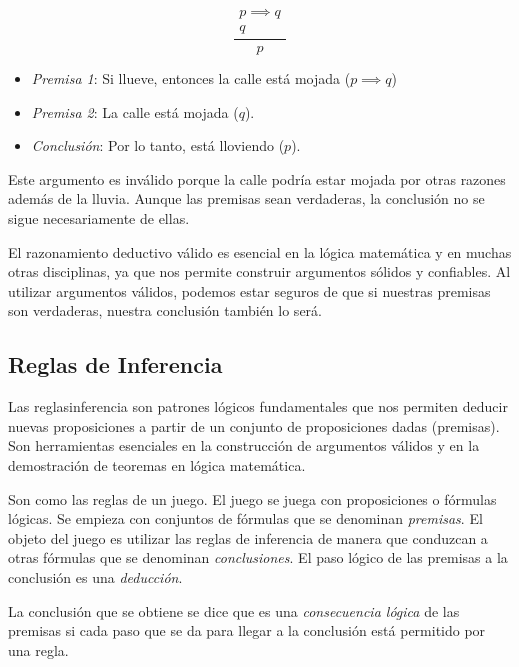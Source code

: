 \begin{fmd-example} 
	\[ \frac{\begin{array}{l}
			p \implies  q\\
			q
	\end{array}}{p} \]
	\begin{itemize}
		\item \textit{Premisa 1}: Si llueve, entonces la calle está mojada ($p \implies q$)
		\item \textit{Premisa 2}: La calle está mojada ($q$).
		\item \textit{Conclusión}: Por lo tanto, está lloviendo ($p$).
	\end{itemize}
	Este argumento es inválido porque la calle podría estar mojada por otras razones además de la lluvia. Aunque las premisas sean verdaderas, la conclusión no se sigue necesariamente de ellas.
\end{fmd-example}

El razonamiento deductivo válido es esencial en la lógica matemática y en muchas otras disciplinas, ya que nos permite construir argumentos sólidos y confiables. Al utilizar argumentos válidos, podemos estar seguros de que si nuestras premisas son verdaderas, nuestra conclusión también lo será.

\subsection{Reglas de Inferencia}
Las \gls{reglasinferencia} son patrones lógicos fundamentales que nos permiten deducir nuevas proposiciones a partir de un conjunto de proposiciones dadas (premisas). Son herramientas esenciales en la construcción de argumentos válidos y en la demostración de teoremas en lógica matemática.

Son como las reglas de un juego. El juego se juega con proposiciones o fórmulas lógicas. Se empieza con conjuntos de fórmulas que se denominan \textit{premisas}. El objeto del juego es utilizar las reglas de inferencia de manera que conduzcan a otras fórmulas que se denominan \textit{conclusiones}. El paso lógico de las premisas a la conclusión es una \textit{deducción}.\vspace{3mm}

La conclusión que se obtiene se dice que es una \textit{consecuencia lógica} de las premisas si cada paso que se da para llegar a la conclusión está permitido por una regla.\vspace{3mm}

